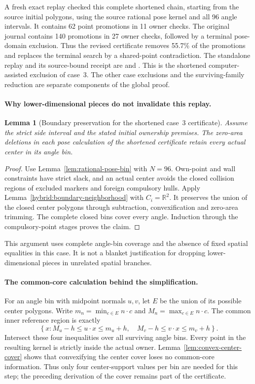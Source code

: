 \documentclass[11pt]{article}
\newtheorem{lemma}[theorem]{Lemma}
\begin{document}
A fresh exact replay checked this complete shortened chain, starting from
the source initial polygons, using the source rational pose kernel and all
96 angle intervals.  It contains 62 point promotions in 11 owner checks.
The original journal contains 140 promotions in 27 owner checks, followed
by a terminal pose-domain exclusion.  Thus the revised certificate removes
55.7\% of the promotions and replaces the terminal search by a shared-point
contradiction.  The standalone replay and its source-bound receipt are
 and .
This is the shortened computer-assisted exclusion of case~3. The other
case exclusions and the surviving-family reduction are separate components
of the global proof.

\paragraph{Why lower-dimensional pieces do not invalidate this replay.}
\begin{lemma}[Boundary preservation for the shortened case~3 certificate]
\label{lem:case-three-boundaries}
Assume the strict side interval and the stated initial ownership premises.
The zero-area deletions in each pose calculation of the shortened
certificate retain every actual center in its angle bin.
\end{lemma}
\begin{proof}
Use Lemma~\ref{lem:rational-pose-bin} with $N=96$. Own-point and wall
constraints have strict slack, and an actual center avoids the closed
collision regions of excluded markers and foreign compulsory hulls.
Apply Lemma~\ref{hybrid:boundary-neighborhood} with $C_i=\mathbb R^2$.
It preserves the union of the closed center polygons through subtraction,
convexification and zero-area trimming. The complete closed bins cover
every angle. Induction through the compulsory-point stages proves the
claim.
\end{proof}
This argument uses complete angle-bin coverage and the absence of fixed
spatial equalities in this case.  It is not a blanket justification for
dropping lower-dimensional pieces in unrelated spatial branches.

\paragraph{The common-core calculation behind the simplification.}
For an angle bin with midpoint normals $u,v$, let $E$ be the union of its
possible center polygons.  Write
$m_n=\min_{c\in E}n\cdot c$ and
$M_n=\max_{c\in E}n\cdot c$.  The common inner reference region is exactly
\[
 \left\{x:
 M_u-h\leq u\cdot x\leq m_u+h,
 \quad M_v-h\leq v\cdot x\leq m_v+h\right\}.
\]
Intersect these four inequalities over all surviving angle bins.  Every
point in the resulting kernel is strictly inside the actual owner.
Lemma~\ref{lem:convex-center-cover} shows that convexifying the center
cover loses no common-core information. Thus only four center-support
values per bin are needed for this step; the preceding derivation of the
cover remains part of the certificate.
\end{document}
